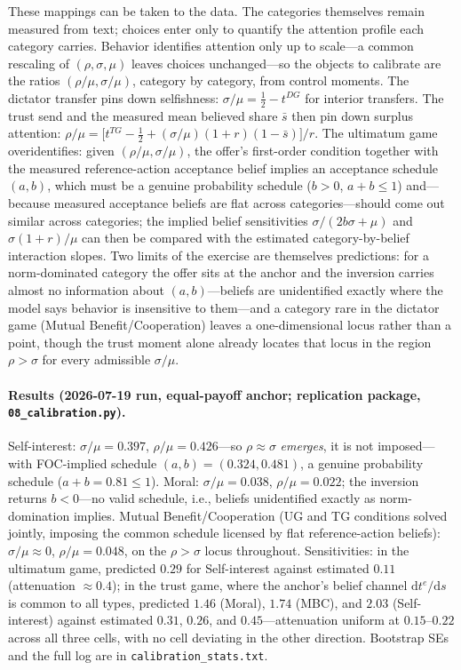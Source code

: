 \documentclass[11pt]{article}
\theoremstyle{plain}
\theoremstyle{remark}
\begin{document}
These mappings can be taken to the data. The categories themselves remain measured from text; choices enter only to quantify the attention profile each category carries. Behavior identifies attention only up to scale---a common rescaling of $(\rho,\sigma,\mu)$ leaves choices unchanged---so the objects to calibrate are the ratios $(\rho/\mu,\sigma/\mu)$, category by category, from control moments. The dictator transfer pins down selfishness: $\sigma/\mu=\tfrac12-t^{DG}$ for interior transfers. The trust send and the measured mean believed share $\bar s$ then pin down surplus attention: $\rho/\mu=\bigl[t^{TG}-\tfrac12+(\sigma/\mu)(1+r)(1-\bar s)\bigr]/r$. The ultimatum game overidentifies: given $(\rho/\mu,\sigma/\mu)$, the offer's first-order condition together with the measured reference-action acceptance belief implies an acceptance schedule $(a,b)$, which must be a genuine probability schedule ($b>0$, $a+b\le1$) and---because measured acceptance beliefs are flat across categories---should come out similar across categories; the implied belief sensitivities $\sigma/(2b\sigma+\mu)$ and $\sigma(1+r)/\mu$ can then be compared with the estimated category-by-belief interaction slopes. Two limits of the exercise are themselves predictions: for a norm-dominated category the offer sits at the anchor and the inversion carries almost no information about $(a,b)$---beliefs are unidentified exactly where the model says behavior is insensitive to them---and a category rare in the dictator game (Mutual Benefit/Cooperation) leaves a one-dimensional locus rather than a point, though the trust moment alone already locates that locus in the region $\rho>\sigma$ for every admissible $\sigma/\mu$.

\paragraph{Results (2026-07-19 run, equal-payoff anchor; replication package, \texttt{08\_calibration.py}).} Self-interest: $\sigma/\mu=0.397$, $\rho/\mu=0.426$---so $\rho\approx\sigma$ \emph{emerges}, it is not imposed---with FOC-implied schedule $(a,b)=(0.324,0.481)$, a genuine probability schedule ($a+b=0.81\le1$). Moral: $\sigma/\mu=0.038$, $\rho/\mu=0.022$; the inversion returns $b<0$---no valid schedule, i.e., beliefs unidentified exactly as norm-domination implies. Mutual Benefit/Cooperation (UG and TG conditions solved jointly, imposing the common schedule licensed by flat reference-action beliefs): $\sigma/\mu\approx0$, $\rho/\mu=0.048$, on the $\rho>\sigma$ locus throughout. Sensitivities: in the ultimatum game, predicted $0.29$ for Self-interest against estimated $0.11$ (attenuation $\approx0.4$); in the trust game, where the anchor's belief channel $\mathrm{d}t^{e}/\mathrm{d}s$ is common to all types, predicted $1.46$ (Moral), $1.74$ (MBC), and $2.03$ (Self-interest) against estimated $0.31$, $0.26$, and $0.45$---attenuation uniform at $0.15$--$0.22$ across all three cells, with no cell deviating in the other direction. Bootstrap SEs and the full log are in \texttt{calibration\_stats.txt}.
\end{document}
